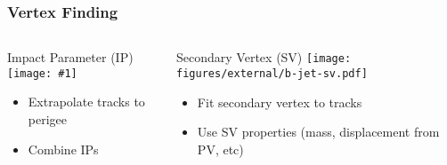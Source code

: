 \documentclass[usenames,dvipsnames]{beamer}
\newcommand{\widegraphic}[1]{\texttt{[image: \#1]}}
\begin{document}
\begin{frame}
  \frametitle{Vertex Finding}
  \begin{columns}[t]
    \begin{column}{0.5\textwidth}
      \begin{center}
        Impact Parameter (IP)
      \widegraphic{figures/external/b-jet-ip.pdf}
      \end{center}
      \begin{itemize}
      \item Extrapolate tracks to perigee
      \item Combine IPs
      \end{itemize}
    \end{column}
    \vline{}
    \begin{column}{0.5\textwidth}
      \begin{center}
        Secondary Vertex (SV)
      \texttt{[image: figures/external/b-jet-sv.pdf]}
        \end{center}
      \begin{itemize}
      \item Fit secondary vertex to tracks
      \item Use SV properties (mass, displacement from PV, etc)
      \end{itemize}
    \end{column}
  \end{columns}
\end{frame}
\end{document}
